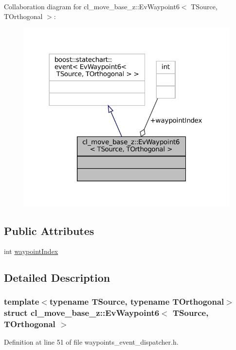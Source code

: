 Collaboration diagram for cl\+\_\+move\+\_\+base\+\_\+z\+:\+:Ev\+Waypoint6$<$ T\+Source, T\+Orthogonal $>$\+:
\nopagebreak
\begin{figure}[H]
\begin{center}
\leavevmode
\includegraphics[width=317pt]{structcl__move__base__z_1_1EvWaypoint6__coll__graph}
\end{center}
\end{figure}
\subsection*{Public Attributes}
\begin{DoxyCompactItemize}
\item 
int \hyperlink{structcl__move__base__z_1_1EvWaypoint6_a29e179077498573199cc66c680666cf2}{waypoint\+Index}
\end{DoxyCompactItemize}


\subsection{Detailed Description}
\subsubsection*{template$<$typename T\+Source, typename T\+Orthogonal$>$\newline
struct cl\+\_\+move\+\_\+base\+\_\+z\+::\+Ev\+Waypoint6$<$ T\+Source, T\+Orthogonal $>$}



Definition at line 51 of file waypoints\+\_\+event\+\_\+dispatcher.\+h.



